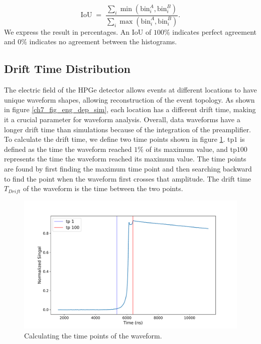 \begin{equation}
  \text{IoU} \;=\; \frac{\sum_{i} \min(\text{bin}_i^A, \text{bin}_i^B)}{\sum_{i} \max(\text{bin}_i^A, \text{bin}_i^B)}.    
\end{equation}
We express the result in percentages. An IoU of $100\%$ indicates perfect agreement and $0\%$ indicates no agreement between the histograms.
 
\subsection{Drift Time Distribution}
The electric field of the HPGe detector allows events at different locations to have unique waveform shapes, allowing reconstruction of the event topology. As shown in figure \ref{ch7_fig_eng_dep_sim}, each location has a different drift time, making it a crucial parameter for waveform analysis. Overall, data waveforms have a longer drift time than simulations because of the integration of the preamplifier. To calculate the drift time, we define two time points shown in figure \ref{fig_ch8_time_calc}. tp$1$ is defined as the time the waveform reached $1\%$ of its maximum value, and tp$100$ represents the time the waveform reached its maximum value. The time points are found by first finding the maximum time point and then searching backward to find the point when the waveform first crosses that amplitude. The drift time $T_{Drift}$ of the waveform is the time between the two points. 

\begin{figure}%
    \centering
    \includegraphics[width=0.9\linewidth]{ch8/figs/time_calc.pdf}
    \caption{Calculating the time points of the waveform.}
    \label{fig_ch8_time_calc}
\end{figure}

